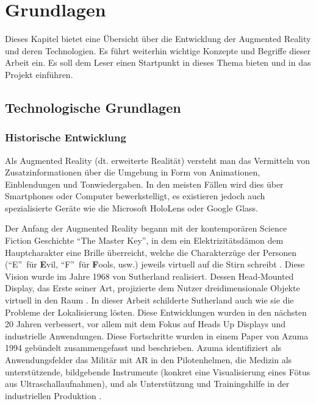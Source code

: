 \documentclass[a4paper]{scrreprt}
\begin{document}
\chapter{Grundlagen}
\label{ch:StandDerForschung}

Dieses Kapitel bietet eine Übersicht über die Entwicklung der Augmented Reality und deren Technologien. Es führt weiterhin wichtige Konzepte und Begriffe dieser Arbeit ein. Es soll dem Leser einen Startpunkt in dieses Thema bieten und in das Projekt einführen.

\section{Technologische Grundlagen}

\subsection{Historische Entwicklung}

Als Augmented Reality (dt. erweiterte Realität) versteht man das Vermitteln von Zusatzinformationen über die Umgebung in Form von Animationen, Einblendungen und Tonwiedergaben. In den meisten Fällen wird dies über Smartphones oder Computer bewerkstelligt, es existieren jedoch auch spezialisierte Geräte wie die Microsoft HoloLens oder Google Glass.

Der Anfang der Augmented Reality begann mit der kontemporären Science Fiction Geschichte \textquotedblleft The Master Key\textquotedblright, in dem ein Elektrizitätsdämon dem Hauptcharakter eine Brille überreicht, welche die Charakterzüge der Personen (\textquotedblleft E\textquotedblright\ für \textbf{E}vil, \textquotedblleft F\textquotedblright\ für \textbf{F}ools, usw.) jeweils virtuell auf die Stirn schreibt \parencite{Baum1901}.
Diese Vision wurde im Jahre 1968 von Sutherland realisiert. Dessen Head-Mounted Display, das Erste seiner Art, projizierte dem Nutzer dreidimensionale Objekte virtuell in den Raum \parencite{Sutherland1968}. In dieser Arbeit schilderte Sutherland auch wie sie die Probleme der Lokalisierung lösten. Diese Entwicklungen wurden in den nächsten 20 Jahren verbessert, vor allem mit dem Fokus auf Heads Up Displays und industrielle Anwendungen. Diese Fortschritte wurden in einem Paper von Azuma 1994 gebündelt zusammengefasst und beschrieben. Azuma identifiziert als Anwendungsfelder das Militär mit AR in den Pilotenhelmen, die Medizin als unterstützende, bildgebende Instrumente (konkret eine Visualisierung eines Fötus aus Ultraschallaufnahmen), und als Unterstützung und Trainingshilfe in der industriellen Produktion \parencite{Azuma1997}.
\end{document}
